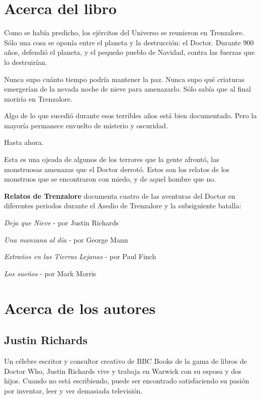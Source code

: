 \section*{Acerca del libro}

Como se había predicho, los ejércitos del Universo se reunieron en Trenzalore. Sólo una cosa se oponía entre el planeta y la destrucción: el Doctor. Durante 900 años, defendió el planeta, y el pequeño pueblo de Navidad, contra las fuerzas que lo destruirían. 

Nunca supo cuánto tiempo podría mantener la paz. Nunca supo qué criaturas emergerían de la nevada noche de nieve para amenazarlo. Sólo sabía que al final moriría en Trenzalore. 

Algo de lo que sucedió durante esos terribles años está bien documentado. Pero la mayoría permanece envuelto de misterio y oscuridad.

Hasta ahora.

Esta es una ojeada de algunos de los terrores que la gente afrontó, las monstruosas amenazas que el Doctor derrotó. Estos son los relatos de los monstruos que se encontraron con miedo, y de aquel hombre que no.

\mbox{}

\textbf{Relatos de Trenzalore} documenta cuatro de las aventuras del Doctor en diferentes periodos durante el Asedio de Trenzalore y la subsiguiente batalla:

\mbox{}

\emph{Deja que Nieve} - por Justin Richards

\emph{Una manzana al día} - por George Mann

\emph{Extraños en las Tierras Lejanas} - por Paul Finch

\emph{Los sueños} - por Mark Morris

\newpage

\section*{Acerca de los autores}

\subsection*{Justin Richards}

Un célebre escritor y consultor creativo de BBC Books de la gama de libros de Doctor Who, Justin Richards vive y trabaja en Warwick con su esposa y dos hijos. Cuando no está escribiendo, puede ser encontrado satisfaciendo su pasión por inventar, leer y ver demasiada televisión.

